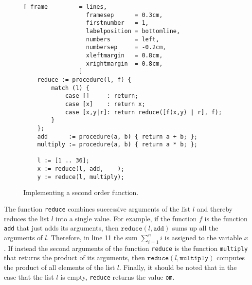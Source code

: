 \begin{figure}[!ht]
\centering
\begin{Verbatim}[ frame         = lines, 
                  framesep      = 0.3cm, 
                  firstnumber   = 1,
                  labelposition = bottomline,
                  numbers       = left,
                  numbersep     = -0.2cm,
                  xleftmargin   = 0.8cm,
                  xrightmargin  = 0.8cm,
                ]
    reduce := procedure(l, f) {
        match (l) {
            case []     : return;
            case [x]    : return x;
            case [x,y|r]: return reduce([f(x,y) | r], f);
        }    
    };
    add      := procedure(a, b) { return a + b; };
    multiply := procedure(a, b) { return a * b; };
    
    l := [1 .. 36];
    x := reduce(l, add,    );
    y := reduce(l, multiply);
\end{Verbatim}
\vspace*{-0.3cm}
\caption{Implementing a second order function.}
\label{fig:reduce.stlx}
\end{figure}
The function \texttt{reduce} combines successive arguments of the list $l$ and thereby reduces
the list $l$ into a single value.  For example, if the function $f$ is the function
\texttt{add} that just adds its arguments, then $\texttt{reduce}(l, \texttt{add})$ sums up
all the arguments of $l$.  Therefore, in line 11 the sum $\sum_{i=1}^n i$ is assigned to the
variable $x$.  If instead the second arguments of the function \texttt{reduce} is the function
\texttt{multiply} that returns the product of its arguments, then 
$\texttt{reduce}(l, \texttt{multiply})$ computes the product of all elements of the list
$l$.  Finally, it should be noted that in the case that the list $l$ is empty,
\texttt{reduce} returns the value \texttt{om}. 


